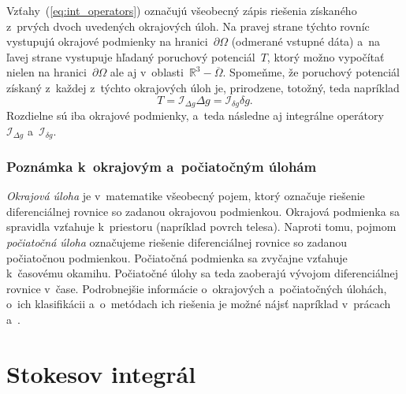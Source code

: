 \documentclass[a4paper, 12pt]{book}
\newcommand{\INT}{\mathcal I}
\begin{document}
Vzťahy~(\ref{eq:int_operators}) označujú všeobecný zápis riešenia získaného 
z~prvých dvoch uvedených okrajových úloh.  Na pravej strane týchto rovníc 
vystupujú okrajové podmienky na hranici~$\partial \Omega$ (odmerané vstupné 
dáta) a~na ľavej strane vystupuje hľadaný poruchový potenciál~$T$, ktorý možno 
vypočítať nielen na hranici~$\partial\Omega$ ale aj v~oblasti~$\mathbb{R}^3 
- \overline\Omega$.  Spomeňme, že poruchový potenciál získaný z~každej z~týchto 
okrajových úloh je, prirodzene, totožný, teda napríklad
%
\begin{equation}
T = \INT_{\Delta g} \Delta g = \INT_{\delta g}\delta g{.}
\end{equation}
%
Rozdielne sú iba okrajové podmienky, a~teda následne aj integrálne 
operátory~$\INT_{\Delta g}$ a~$\INT_{\delta g}$.


\subsubsection{Poznámka k~okrajovým a~počiatočným úlohám}

\emph{Okrajová úloha} je v~matematike všeobecný pojem, ktorý označuje riešenie 
diferenciálnej rovnice so zadanou okrajovou podmienkou.  Okrajová podmienka sa 
spravidla vzťahuje k~priestoru (napríklad povrch telesa).  Naproti tomu, pojmom 
\emph{počiatočná úloha} označujeme riešenie diferenciálnej rovnice so zadanou 
počiatočnou podmienkou.  Počiatočná podmienka sa zvyčajne vzťahuje k~časovému 
okamihu.  Počiatočné úlohy sa teda zaoberajú vývojom diferenciálnej rovnice 
v~čase.  Podrobnejšie informácie o~okrajových a~počiatočných úlohách, o~ich 
klasifikácii a~o~metódach ich riešenia je možné nájsť napríklad v~prácach 
\textcite{Janak2006} a~\textcite{Macak2021}.


\section{Stokesov integrál}
\label{sec:stokes_integral}
\end{document}
